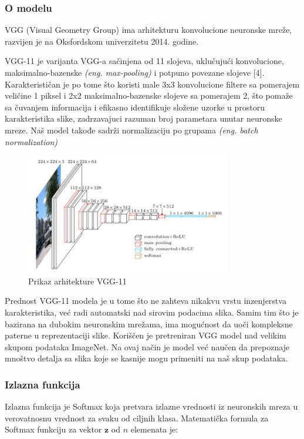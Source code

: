 \documentclass{article}
\begin{document}
\subsubsection{O modelu}

VGG (Visual Geometry Group) ima arhitekturu konvolucione neuronske mreže, razvijen je na Oksfordskom univerzitetu 2014. godine.
\par
VGG-11 je varijanta VGG-a sačinjena od 11 slojeva, uklučujući konvolucione, maksimalno-bazenske \textit{(eng. max-pooling)} i potpuno povezane slojeve [4]. Karakterističan je po tome što koristi male 3x3 konvolucione filtere sa pomerajem veličine 1 piksel i 2x2 maksimalno-bazenske slojeve sa pomerajem 2, što pomaže sa čuvanjem informacija i efikasno identifikuje složene uzorke u prostoru karakteristika slike, zadrzavajuci razuman broj parametara unutar neuronske mreze. Naš model takođe sadrži normalizaciju po grupama \textit{(eng. batch normalization)}

\begin{figure}[H]
    \centering
    \includegraphics[width=0.8\textwidth]{vgg.jpg} 
    \caption{Prikaz arhitekture VGG-11} 
    \label{Arhitektura VGG11}
\end{figure}

Prednost VGG-11 modela je u tome što ne zahteva nikakvu vrstu inzenjerstva karakteristika, već radi automatski nad sirovim podacima slika. Samim tim što je bazirana na dubokim neuronskim mrežama, ima mogućnost da uoči kompleksne paterne u reprezentaciji slike. Koriščen je pretreniran VGG model nad velikim skupom podataka ImageNet. Na ovaj način je model već naučen da prepoznaje mnoštvo detalja sa slika koje se kasnije mogu primeniti na naš skup podataka.

\subsubsection{Izlazna funkcija}
Izlazna funkcija je Softmax koja pretvara izlazne vrednosti iz neuronskih mreza u verovatnosnu vrednost za svaku od ciljnih klasa.
Matematička formula za Softmax funkciju za vektor \(\mathbf{z}\) od \(n\) elemenata je:
\end{document}
